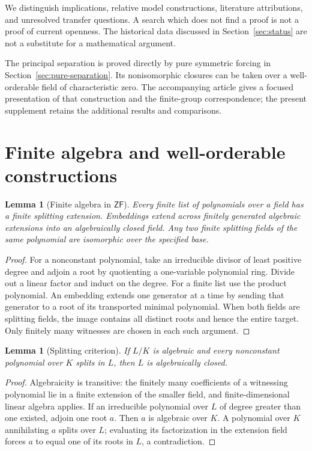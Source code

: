 \documentclass[11pt,a4paper]{article}
\newtheorem{lemma}[theorem]{Lemma}
\theoremstyle{definition}\newtheorem{definition}[theorem]{Definition}
\theoremstyle{remark}\newtheorem{remark}[theorem]{Remark}
\newcommand{\ZF}{\mathsf{ZF}}\newcommand{\ZFA}{\mathsf{ZFA}}
\begin{document}
We distinguish implications, relative model constructions, literature attributions, and unresolved transfer questions. A search which does not find a proof is not a proof of current openness. The historical data discussed in Section~\ref{sec:status} are not a substitute for a mathematical argument.

The principal separation is proved directly by pure symmetric forcing in Section~\ref{sec:pure-separation}. Its nonisomorphic closures can be taken over a well-orderable field of characteristic zero. The accompanying article gives a focused presentation of that construction and the finite-group correspondence; the present supplement retains the additional results and comparisons.

\section{Finite algebra and well-orderable constructions}
\begin{lemma}[Finite algebra in $\ZF$]\label{lem:finite}
Every finite list of polynomials over a field has a finite splitting extension. Embeddings extend across finitely generated algebraic extensions into an algebraically closed field. Any two finite splitting fields of the same polynomial are isomorphic over the specified base.
\end{lemma}
\begin{proof}
For a nonconstant polynomial, take an irreducible divisor of least positive degree and adjoin a root by quotienting a one-variable polynomial ring. Divide out a linear factor and induct on the degree. For a finite list use the product polynomial. An embedding extends one generator at a time by sending that generator to a root of its transported minimal polynomial. When both fields are splitting fields, the image contains all distinct roots and hence the entire target. Only finitely many witnesses are chosen in each such argument.
\end{proof}

\begin{lemma}[Splitting criterion]\label{lem:splitting}
If $L/K$ is algebraic and every nonconstant polynomial over $K$ splits in $L$, then $L$ is algebraically closed.
\end{lemma}
\begin{proof}
Algebraicity is transitive: the finitely many coefficients of a witnessing polynomial lie in a finite extension of the smaller field, and finite-dimensional linear algebra applies. If an irreducible polynomial over $L$ of degree greater than one existed, adjoin one root $a$. Then $a$ is algebraic over $K$. A polynomial over $K$ annihilating $a$ splits over $L$; evaluating its factorization in the extension field forces $a$ to equal one of its roots in $L$, a contradiction.
\end{proof}
\end{document}
